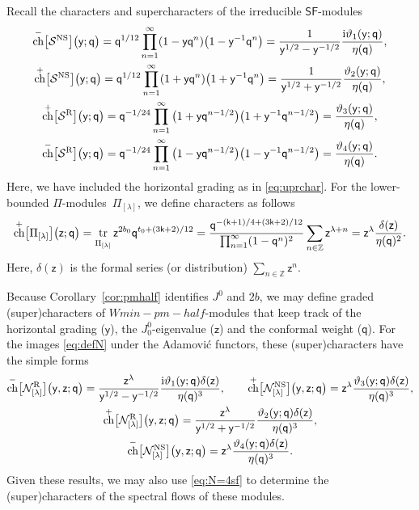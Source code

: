 \documentclass[10pt,a4paper]{amsart}
\numberwithin{equation}{section}
\newcommand{\ii}{\mathrm{i}} %
\newcommand{\kk}{\mathsf{k}} %
\newcommand{\qq}{\mathsf{q}} %
\newcommand{\yy}{\mathsf{y}} %
\newcommand{\zz}{\mathsf{z}} %
\newcommand{\NS}{\textnormal{NS}}
\newcommand{\R}{\textnormal{R}}
\DeclarePairedDelimiter{\brac}{\lparen}{\rparen} %
\DeclarePairedDelimiter{\sqbrac}{\lbrack}{\rbrack} %
\newcommand{\fld}[1]{\mathbb{#1}} %
\newcommand{\VOA}[1]{\mathsf{#1}} %
\newcommand{\Mod}[1]{\mathcal{#1}} %
\newcommand{\ZZ}{\fld{Z}}
\newcommand{\sfsymb}{\VOA{SF}}
\newcommand{\lsymb}{\Pi}
\newcommand{\sfvoa}{\sfsymb} %
\newcommand{\lvoa}{\lsymb} %
\newcommand{\swalg}[2]{\VOA{W}_{#1}^{\mathrm{#2}}} %
\newcommand{\smin}[1][\kk]{\swalg{#1}{min}} %
\newcommand{\sminpmhalf}{\smin[\pm 1/2]}
\newcommand{\lmod}[1]{\lsymb_{[#1]}} %
\newcommand{\sfnsmod}{\Mod{S}^{\NS}} %
\newcommand{\sfrmod}{\Mod{S}^{\R}} %
\newcommand{\nnsind}[1]{\Mod{N}^{\NS}_{[#1]}} %
\newcommand{\nrind}[1]{\Mod{N}^{\R}_{[#1]}}
\DeclareMathOperator{\tr}{tr}
\newcommand{\traceover}[1]{\tr_{\raisebox{-2pt}{$\scriptstyle #1$}}} %
\newcommand{\Gr}[1]{\sqbrac[\big]{#1}} %
\DeclareMathOperator{\chmap}{ch}
\newcommand{\ch}[1]{\chmap^+ \Gr{#1}} %
\newcommand{\fch}[2]{\ch{#1} \brac[\big]{#2}} %
\newcommand{\sch}[1]{\chmap^- \Gr{#1}} %
\newcommand{\fsch}[2]{\sch{#1} \brac[\big]{#2}}
\def\smash#1{#1}
\def\sminpmhalf{Wmin-pm-half}
\begin{document}
Recall the characters and supercharacters of the irreducible $\sfvoa$-modules
\begin{gather*}
 \fsch{\sfnsmod}{\yy;\qq} = \qq^{1/12} \prod_{n=1}^{\infty} (1-\yy\qq^n)\big(1-\yy^{-1}\qq^n\big)
 = \frac{1}{\yy^{1/2}-\yy^{-1/2}} \frac{\ii \vartheta_{1}(\yy;\qq)}{\eta(\qq)}, \\
 \fch{\sfnsmod}{\yy;\qq} = \qq^{1/12} \prod_{n=1}^{\infty} (1+\yy\qq^n)\big(1+\yy^{-1}\qq^n\big)
 = \frac{1}{\yy^{1/2}+\yy^{-1/2}} \frac{\vartheta_{2}(\yy;\qq)}{\eta(\qq)}, \\
 \fch{\sfrmod}{\yy;\qq} = \qq^{-1/24} \prod_{n=1}^{\infty} \big(1+\yy\qq^{n-1/2}\big)\big(1+\yy^{-1}\qq^{n-1/2}\big)
 = \frac{\vartheta_{3}(\yy;\qq)}{\eta(\qq)}, \\
 \fsch{\sfrmod}{\yy;\qq} = \qq^{-1/24} \prod_{n=1}^{\infty} \big(1-\yy\qq^{n-1/2}\big)\big(1-\yy^{-1}\qq^{n-1/2}\big)
 = \frac{\vartheta_{4}(\yy;\qq)}{\eta(\qq)}.
\end{gather*}
Here, we have included the horizontal grading as in \eqref{eq:uprchar}.
For the lower-bounded $\lvoa$-modules~\smash{$\lmod{\lambda}$}, we define characters as follows
\[
	\fch{\lmod{\lambda}}{\zz;\qq}
	= \traceover{\lmod{\lambda}} \zz^{2b_0} \qq^{t_{0} + (3\kk+2)/12}
	= \frac{\qq^{-(\kk+1)/4 + (3\kk+2)/12}}{\prod_{n=1}^{\infty} (1-\qq^n)^2} \sum_{n \in \ZZ} \zz^{\lambda+n}
	= \zz^{\lambda} \frac{\delta(\zz)}{\eta(\qq)^2}.
\]
Here, $\delta(\zz)$ is the formal series (or distribution) $\sum_{n\in\ZZ} \zz^n$.

Because Corollary~\ref{cor:pmhalf} identifies $J^0$ and $2b$, we may define graded (super)characters of \smash{$\sminpmhalf$}-modules that keep track of the horizontal grading ($\yy$), the $J^0_0$-eigenvalue ($\zz$) and the conformal weight ($\qq$).
For the images \eqref{eq:defN} under the Adamovi\'{c} functors, these (super)characters have the simple forms
\begin{gather}
		\fsch{\nrind{\lambda}}{\yy,\zz;\qq} = \frac{\zz^{\lambda}}{\yy^{1/2}-\yy^{-1/2}} \frac{\ii \vartheta_{1}(\yy;\qq) \delta(\zz)}{\eta(\qq)^3}, \qquad
		\fch{\nnsind{\lambda}}{\yy,\zz;\qq} = \zz^{\lambda} \frac{\vartheta_{3}(\yy;\qq) \delta(\zz)}{\eta(\qq)^3},\nonumber \\
		\fch{\nrind{\lambda}}{\yy,\zz;\qq} = \frac{\zz^{\lambda}}{\yy^{1/2}+\yy^{-1/2}} \frac{\vartheta_{2}(\yy;\qq) \delta(\zz)}{\eta(\qq)^3}, \nonumber \\
		\fsch{\nnsind{\lambda}}{\yy,\zz;\qq} = \zz^{\lambda} \frac{\vartheta_{4}(\yy;\qq) \delta(\zz)}{\eta(\qq)^3}. \label{eq:N=4(s)ch}
\end{gather}
Given these results, we may also use \eqref{eq:N=4sf} to determine the (super)characters of the spectral flows of these modules.
\end{document}
